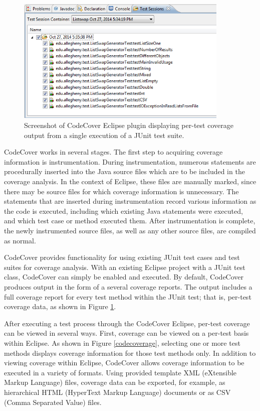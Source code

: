 \begin{figure}[htpb]
  \centering
  \includegraphics[width=4in]{img/codecoverpertest.png}
  \caption{Screenshot of CodeCover Eclipse plugin displaying per-test coverage
  output from a single execution of a JUnit test suite.}
  \label{codecover}
\end{figure}

CodeCover works in several stages.  The first step to acquiring coverage
information is instrumentation.  During instrumentation, numerous
statements are procedurally inserted into the Java source files which 
are to be included in the coverage analysis.  In the context of Eclipse,
these files are manually marked, since there may be source files for 
which coverage information is unnecessary.  The statements that are 
inserted during instrumentation record various information as the code
is executed, including which existing Java statements were executed, and
which test case or method executed them.  After instrumentation is
complete, the newly instrumented source files, as well as any other source
files, are compiled as normal.

CodeCover provides functionality for using existing JUnit test cases and
test suites for coverage analysis. With an existing Eclipse project with 
a JUnit test class, CodeCover can simply be enabled and executed.  By 
default, CodeCover produces output in the form of a several coverage
reports.  The output includes a full coverage report for every test method 
within the JUnit test; that is, per-test coverage data, as shown in Figure
\ref{codecover}.  

After executing a test process through the CodeCover Eclipse, per-test
coverage can be viewed in several ways.  First, coverage can be viewed on 
a per-test basis within Eclipse.  As shown in Figure \ref{codecoverage}, 
selecting one or more test methods displays coverage information for those
test methods only.  In addition to viewing coverage within Eclipse, CodeCover
allows coverage information to be executed in a variety of formats.  Using
provided template XML (eXtensible Markup Language) files, coverage data can be exported, for example, as
hierarchical HTML (HyperText Markup Language) documents or as CSV (Comma Separated Value) files.  

